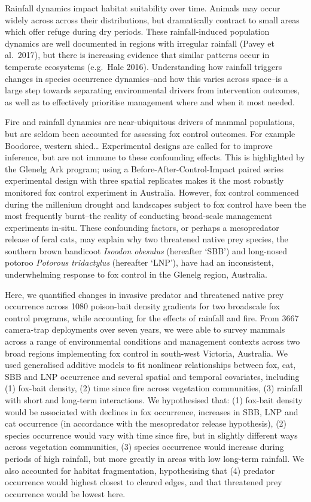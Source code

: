 \documentclass[11pt,a4paper,titlepage,twoside,openright]{style/unimelbthesis}
\begin{document}
\begin{mainmatter}
Rainfall dynamics impact habitat suitability over time. Animals may occur widely across across their distributions, but dramatically contract to small areas which offer refuge during dry periods. These rainfall-induced population dynamics are well documented in regions with irregular rainfall (Pavey et al.~2017), but there is increasing evidence that similar patterns occur in temperate ecosystems (e.g.~Hale 2016). Understanding how rainfall triggers changes in species occurrence dynamics--and how this varies across space--is a large step towards separating environmental drivers from intervention outcomes, as well as to effectively prioritise management where and when it most needed.

Fire and rainfall dynamics are near-ubiquitous drivers of mammal populations, but are seldom been accounted for assessing fox control outcomes. For example Boodoree, western shied\ldots{} Experimental designs are called for to improve inference, but are not immune to these confounding effects. This is highlighted by the Glenelg Ark program; using a Before-After-Control-Impact paired series experimental design with three spatial replicates makes it the most robustly monitored fox control experiment in Australia. However, fox control commenced during the millenium drought and landscapes subject to fox control have been the most frequently burnt--the reality of conducting broad-scale management experiments in-situ. These confounding factors, or perhaps a mesopredator release of feral cats, may explain why two threatened native prey species, the southern brown bandicoot \emph{Isoodon obesulus} (hereafter `SBB') and long-nosed potoroo \emph{Potorous tridactylus} (hereafter `LNP'), have had an inconsistent, underwhelming response to fox control in the Glenelg region, Australia.

Here, we quantified changes in invasive predator and threatened native prey occurrence across 1080 poison-bait density gradients for two broadscale fox control programs, while accounting for the effects of rainfall and fire. From 3667 camera-trap deployments over seven years, we were able to survey mammals across a range of environmental conditions and management contexts across two broad regions implementing fox control in south-west Victoria, Australia. We used generalised additive models to fit nonlinear relationships between fox, cat, SBB and LNP occurrence and several spatial and temporal covariates, including (1) fox-bait density, (2) time since fire across vegetation communities, (3) rainfall with short and long-term interactions. We hypothesised that: (1) fox-bait density would be associated with declines in fox occurrence, increases in SBB, LNP and cat occurrence (in accordance with the mesopredator release hypothesis), (2) species occurrence would vary with time since fire, but in slightly different ways across vegetation communities, (3) species occurrence would increase during periods of high rainfall, but more greatly in areas with low long-term rainfall. We also accounted for habitat fragmentation, hypothesising that (4) predator occurrence would highest closest to cleared edges, and that threatened prey occurrence would be lowest here.


\end{mainmatter}
\end{document}
